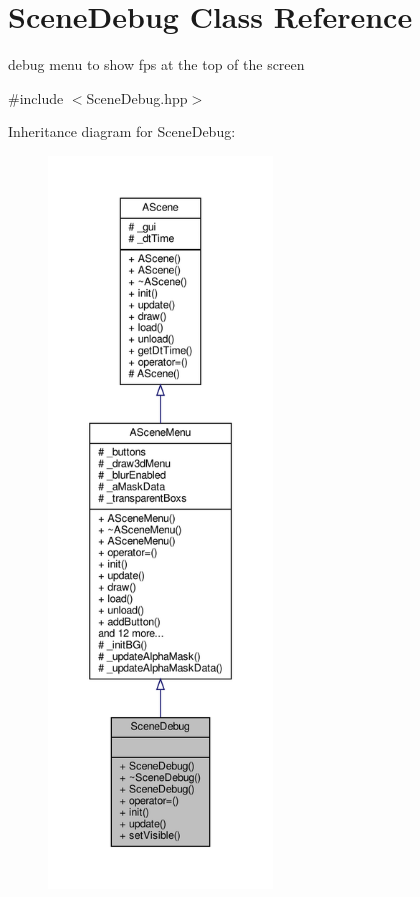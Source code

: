 \hypertarget{class_scene_debug}{}\section{Scene\+Debug Class Reference}
\label{class_scene_debug}


debug menu to show fps at the top of the screen  




{\ttfamily \#include $<$Scene\+Debug.\+hpp$>$}



Inheritance diagram for Scene\+Debug\+:
\nopagebreak
\begin{figure}[H]
\begin{center}
\leavevmode
\includegraphics[height=550pt]{class_scene_debug__inherit__graph}
\end{center}
\end{figure}


